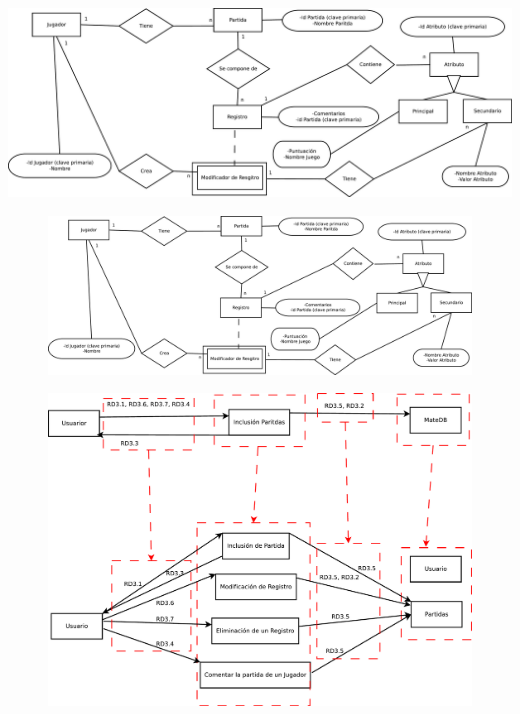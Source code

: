 \includegraphics{../Diagramas/pdf/ER-Inclusion}

\begin{figure}
	\centering
	\includegraphics[width=0.7\linewidth]{../Diagramas/pdf/ER-Inclusion}
	\caption[Diagrama entidad relación del sistema de inclusión]{}
	\caption{}
	\label{fig:ER}
\end{figure}



\begin{figure}
\centering
\includegraphics[width=0.7\linewidth]{../Diagramas/pdf/RefinamientoInclusion}
\caption[Refinamiento del sistema de inclusión]{}
\caption{}
\label{fig:RefinamientoInclusion}
\end{figure}
